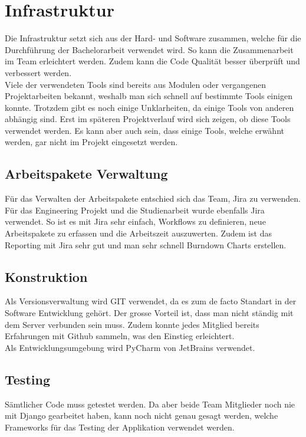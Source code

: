 \section{Infrastruktur}
Die Infrastruktur setzt sich aus der Hard- und Software zusammen, welche für die Durchführung der Bachelorarbeit verwendet wird. So kann die Zusammenarbeit im Team erleichtert werden. Zudem kann die Code Qualität besser überprüft und verbessert werden.
\\
Viele der verwendeten Tools sind bereits aus Modulen oder vergangenen Projektarbeiten bekannt, weshalb man sich schnell auf bestimmte Tools einigen konnte. Trotzdem gibt es noch einige Unklarheiten, da einige Tools von anderen abhängig sind. Erst im späteren Projektverlauf wird sich zeigen, ob diese Tools verwendet werden. Es kann aber auch sein, dass einige Tools, welche erwähnt werden, gar nicht im Projekt eingesetzt werden.

\subsection{Arbeitspakete Verwaltung}
Für das Verwalten der Arbeitspakete entschied sich das Team, Jira zu verwenden. Für das Engineering Projekt und die Studienarbeit wurde ebenfalls Jira verwendet. So ist es mit Jira sehr einfach, Workflows zu definieren, neue Arbeitspakete zu erfassen und die Arbeitszeit auszuwerten. Zudem ist das Reporting mit Jira sehr gut und man sehr schnell Burndown Charts erstellen.

\subsection{Konstruktion}
Als Versionsverwaltung wird GIT verwendet, da es zum de facto Standart in der Software Entwicklung gehört. Der grosse Vorteil ist, dass man nicht ständig mit dem Server verbunden sein muss. Zudem konnte jedes Mitglied bereits Erfahrungen mit Github sammeln, was den Einstieg erleichtert.
\\
Als Entwicklungsumgebung wird PyCharm von JetBrains verwendet.

\subsection{Testing}
Sämtlicher Code muss getestet werden. Da aber beide Team Mitglieder noch nie mit Django gearbeitet haben, kann noch nicht genau gesagt werden, welche Frameworks für das Testing der Applikation verwendet werden.


